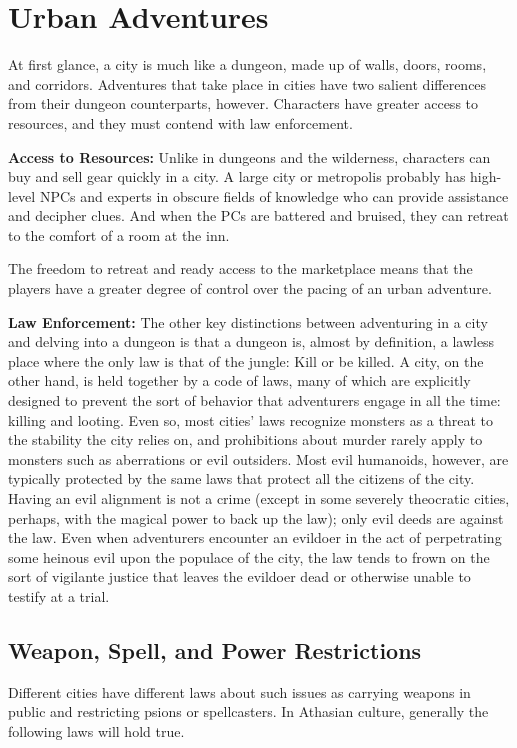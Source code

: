 \section{Urban Adventures}
At first glance, a city is much like a dungeon, made up of walls, doors, rooms, and corridors. Adventures that take place in cities have two salient differences from their dungeon counterparts, however. Characters have greater access to resources, and they must contend with law enforcement.

\textbf{Access to Resources:} Unlike in dungeons and the wilderness, characters can buy and sell gear quickly in a city. A large city or metropolis probably has high-level NPCs and experts in obscure fields of knowledge who can provide assistance and decipher clues. And when the PCs are battered and bruised, they can retreat to the comfort of a room at the inn.

The freedom to retreat and ready access to the marketplace means that the players have a greater degree of control over the pacing of an urban adventure.

\textbf{Law Enforcement:} The other key distinctions between adventuring in a city and delving into a dungeon is that a dungeon is, almost by definition, a lawless place where the only law is that of the jungle: Kill or be killed. A city, on the other hand, is held together by a code of laws, many of which are explicitly designed to prevent the sort of behavior that adventurers engage in all the time: killing and looting. Even so, most cities' laws recognize monsters as a threat to the stability the city relies on, and prohibitions about murder rarely apply to monsters such as aberrations or evil outsiders. Most evil humanoids, however, are typically protected by the same laws that protect all the citizens of the city. Having an evil alignment is not a crime (except in some severely theocratic cities, perhaps, with the magical power to back up the law); only evil deeds are against the law. Even when adventurers encounter an evildoer in the act of perpetrating some heinous evil upon the populace of the city, the law tends to frown on the sort of vigilante justice that leaves the evildoer dead or otherwise unable to testify at a trial.

\subsection{Weapon, Spell, and Power Restrictions}
Different cities have different laws about such issues as carrying weapons in public and restricting psions or spellcasters. In Athasian culture, generally the following laws will hold true.%

